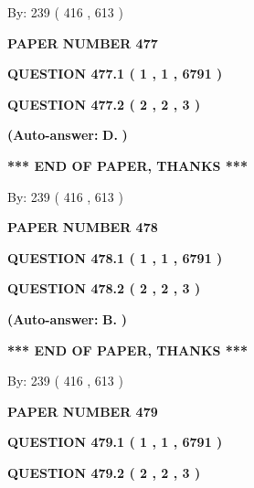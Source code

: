 \documentclass[12pt]{article}
\begin{document}
   
\hspace{1.0in} By: 
 239 ( 416 ,  613 )
   
   
   
   
\newpage 
\setcounter{page}{ 
   477001 } 
   
   
 {\textbf{ \Large{ PAPER NUMBER  477  }}}
   
   
   
   
  
  
{\textbf{\large{QUESTION
477.1 
 ( 1 , 1 , 6791 )
}}}
  
  
{\textbf{\large{QUESTION
477.2 
 ( 2 , 2 , 3 )
}}}
 
 
{\textbf{(Auto-answer:}}
{\textbf{\large{
D.}}}
{\textbf{)}}
 
 
   
   
   
   
\vspace{1.0in} 
{\textbf{\large{ *** END OF PAPER, THANKS *** }}} 
   
   
\hspace{1.0in} By: 
 239 ( 416 ,  613 )
   
   
   
   
\newpage 
\setcounter{page}{ 
   478001 } 
   
   
 {\textbf{ \Large{ PAPER NUMBER  478  }}}
   
   
   
   
  
  
{\textbf{\large{QUESTION
478.1 
 ( 1 , 1 , 6791 )
}}}
  
  
{\textbf{\large{QUESTION
478.2 
 ( 2 , 2 , 3 )
}}}
 
 
{\textbf{(Auto-answer:}}
{\textbf{\large{
B.}}}
{\textbf{)}}
 
 
   
   
   
   
\vspace{1.0in} 
{\textbf{\large{ *** END OF PAPER, THANKS *** }}} 
   
   
\hspace{1.0in} By: 
 239 ( 416 ,  613 )
   
   
   
   
\newpage 
\setcounter{page}{ 
   479001 } 
   
   
 {\textbf{ \Large{ PAPER NUMBER  479  }}}
   
   
   
   
  
  
{\textbf{\large{QUESTION
479.1 
 ( 1 , 1 , 6791 )
}}}
  
  
{\textbf{\large{QUESTION
479.2 
 ( 2 , 2 , 3 )
}}}
 
\end{document}
